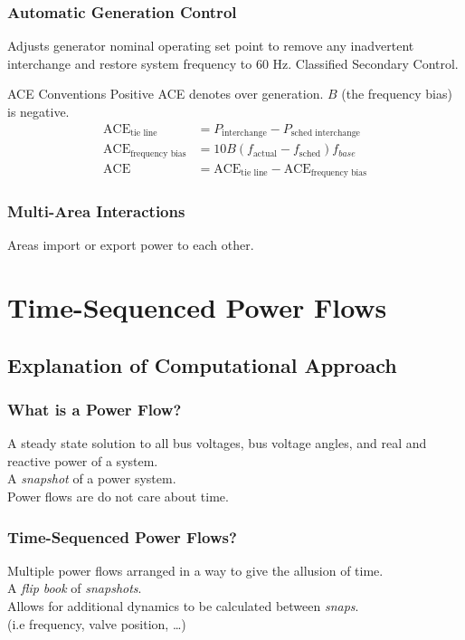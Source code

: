 \documentclass[14pt, unknownkeysallowed]{beamer}
\begin{document}
\begin{frame}
\frametitle{Automatic Generation Control}
Adjusts generator nominal operating set point to remove any inadvertent interchange and restore system frequency to 60 Hz. Classified Secondary Control.

ACE Conventions Positive ACE denotes over generation. $B$ (the frequency bias) is negative.
\begin{align*}
\text{ACE}_{\text{tie line}} &= P_{\text{interchange}} - P_{\text{sched interchange}}\\
\text{ACE}_{\text{frequency bias}} &= 10B(f_{\text{actual}}-f_{\text{sched}})f_{base}\\
\text{ACE} &= \text{ACE}_{\text{tie line}} -\text{ACE}_{\text{frequency bias}}
\end{align*}

\end{frame}
\begin{frame}
\frametitle{Multi-Area Interactions}

Areas import or export power to each other.
\end{frame}
\section{Time-Sequenced Power Flows}
\subsection{Explanation of Computational Approach}
\begin{frame}
\frametitle{What is a Power Flow?}
A steady state solution to all bus voltages, bus voltage angles, and real  and reactive power of a system.\\
\vspace{1em}
A \emph{snapshot} of a power system. \\%
\vspace{1em}
Power flows are do not care about time.
\end{frame}
\begin{frame}
\frametitle{Time-Sequenced Power Flows?}
Multiple power flows arranged in a way to give the allusion of time.\\
\vspace{1em}
A \emph{flip book} of \emph{snapshots}.\\
\vspace{1em}
Allows for additional dynamics to be calculated between \emph{snaps}.\\(i.e frequency, valve position, \ldots )\\
\end{frame}
\end{document}
